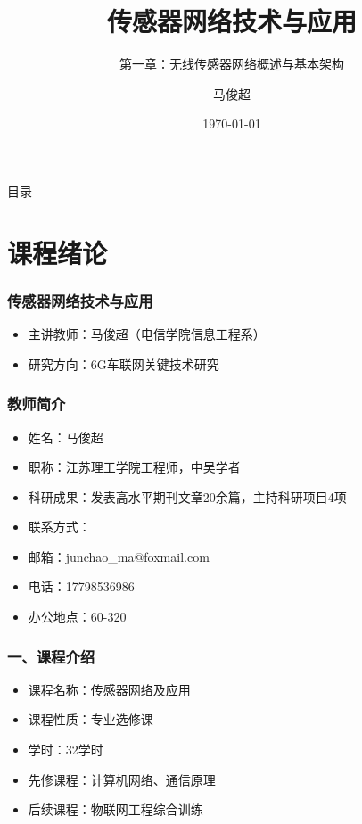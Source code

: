 \documentclass[aspectratio=43]{beamer}
\title{传感器网络技术与应用}
\subtitle{第一章：无线传感器网络概述与基本架构}
\author{马俊超}
\institute{江苏理工学院 电信学院信息工程系}
\date{\today}
\begin{document}
\begin{frame}
  \titlepage
\end{frame}

\begin{frame}{目录}
  \tableofcontents
\end{frame}

\section{课程绪论}

\begin{frame}
  \frametitle{传感器网络技术与应用}

  \begin{itemize}
  \item<+-> 主讲教师：马俊超（电信学院信息工程系）
  \item<+-> 研究方向：6G车联网关键技术研究
  \end{itemize}
\end{frame}

\begin{frame}
  \frametitle{教师简介}

  \begin{itemize}
  \item<+-> 姓名：马俊超
  \item<+-> 职称：江苏理工学院工程师，中吴学者
  \item<+-> 科研成果：发表高水平期刊文章20余篇，主持科研项目4项
  \item<+-> 联系方式：
  \item<+-> 邮箱：junchao\_ma@foxmail.com
  \item<+-> 电话：17798536986
  \item<+-> 办公地点：60-320
  \end{itemize}
\end{frame}

\begin{frame}
  \frametitle{一、课程介绍}

  \begin{itemize}
  \item<+-> 课程名称：传感器网络及应用
  \item<+-> 课程性质：专业选修课
  \item<+-> 学时：32学时
  \item<+-> 先修课程：计算机网络、通信原理
  \item<+-> 后续课程：物联网工程综合训练
  \end{itemize}
\end{frame}
\end{document}
